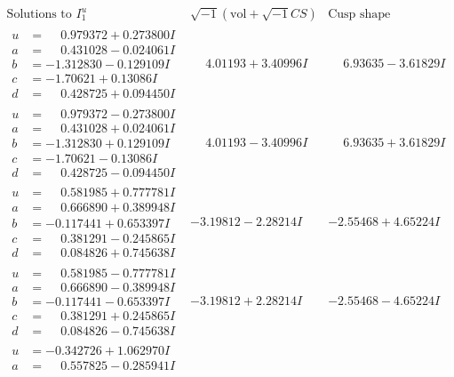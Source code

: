 \documentclass[1p]{elsarticle_modified}
\theoremstyle{definition}
\newcommand{\I}{\sqrt{-1}}
\begin{document}
$$\begin{array}{c|c|c}  
\text{Solutions to }I^u_{1}& \I (\text{vol} + \sqrt{-1}CS) & \text{Cusp shape}\\
 \hline 
\begin{aligned}
u &= \phantom{-}0.979372 + 0.273800 I \\
a &= \phantom{-}0.431028 - 0.024061 I \\
b &= -1.312830 - 0.129109 I \\
c &= -1.70621 + 0.13086 I \\
d &= \phantom{-}0.428725 + 0.094450 I\end{aligned}
 & \phantom{-}4.01193 + 3.40996 I & \phantom{-}6.93635 - 3.61829 I \\ \hline\begin{aligned}
u &= \phantom{-}0.979372 - 0.273800 I \\
a &= \phantom{-}0.431028 + 0.024061 I \\
b &= -1.312830 + 0.129109 I \\
c &= -1.70621 - 0.13086 I \\
d &= \phantom{-}0.428725 - 0.094450 I\end{aligned}
 & \phantom{-}4.01193 - 3.40996 I & \phantom{-}6.93635 + 3.61829 I \\ \hline\begin{aligned}
u &= \phantom{-}0.581985 + 0.777781 I \\
a &= \phantom{-}0.666890 + 0.389948 I \\
b &= -0.117441 + 0.653397 I \\
c &= \phantom{-}0.381291 - 0.245865 I \\
d &= \phantom{-}0.084826 + 0.745638 I\end{aligned}
 & -3.19812 - 2.28214 I & -2.55468 + 4.65224 I \\ \hline\begin{aligned}
u &= \phantom{-}0.581985 - 0.777781 I \\
a &= \phantom{-}0.666890 - 0.389948 I \\
b &= -0.117441 - 0.653397 I \\
c &= \phantom{-}0.381291 + 0.245865 I \\
d &= \phantom{-}0.084826 - 0.745638 I\end{aligned}
 & -3.19812 + 2.28214 I & -2.55468 - 4.65224 I \\ \hline\begin{aligned}
u &= -0.342726 + 1.062970 I \\
a &= \phantom{-}0.557825 - 0.285941 I \\

\end{aligned}
\end{array}$$
\end{document}
